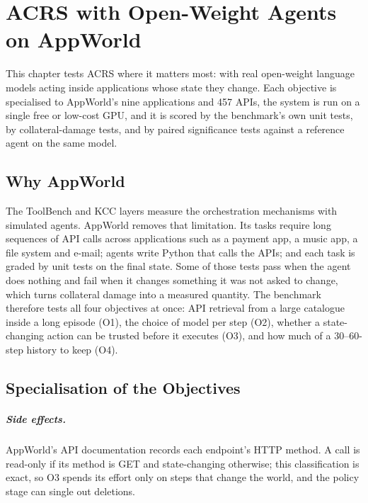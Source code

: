 \chapter{ACRS with Open-Weight Agents on AppWorld}
\label{ch:appworld}

\begin{chaptersummary}
This chapter tests ACRS where it matters most: with real open-weight language models acting inside
applications whose state they change. Each objective is specialised to AppWorld's nine applications and
457 APIs, the system is run on a single free or low-cost GPU, and it is scored by the benchmark's own
unit tests, by collateral-damage tests, and by paired significance tests against a reference agent on
the same model.
\end{chaptersummary}

\section{Why AppWorld}
\label{sec:aw-why}

The ToolBench and KCC layers measure the orchestration mechanisms with simulated agents. AppWorld
\citep{trivedi2024appworld} removes that limitation. Its tasks require long sequences of API calls across
applications such as a payment app, a music app, a file system and e-mail; agents write Python that
calls the APIs; and each task is graded by unit tests on the final state. Some of those tests pass when
the agent does nothing and fail when it changes something it was not asked to change, which turns
collateral damage into a measured quantity. The benchmark therefore tests all four objectives at once:
API retrieval from a large catalogue inside a long episode (O1), the choice of model per step (O2),
whether a state-changing action can be trusted before it executes (O3), and how much of a 30--60-step
history to keep (O4).

\section{Specialisation of the Objectives}
\label{sec:aw-spec}

\paragraph{Side effects.} AppWorld's API documentation records each endpoint's HTTP method. A call is
read-only if its method is GET and state-changing otherwise; this classification is exact, so O3 spends
its effort only on steps that change the world, and the policy stage can single out deletions.

